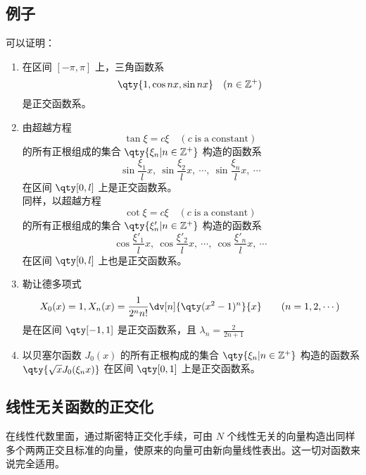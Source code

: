 \subsection{例子}
可以证明：
\begin{enumerate}
\item 在区间 $[-\pi,\pi]$ 上，三角函数系
\begin{equation}
\qty{1,\cos nx,\sin nx}\quad(n\in \mathbb{Z^{+}})~
\end{equation}
是正交函数系。
\item 由超越方程
\begin{equation}
\tan\xi=c\xi \quad(c\; \mathrm{is\; a\; constant})~
\end{equation}
 的所有正根组成的集合 $\qty{\xi_n\vert n\in\mathbb{Z}^+}$
 构造的函数系
 \begin{equation}
 \sin\frac{\xi_1}{l}x,\ \sin\frac{\xi_2}{l}x,\ \cdots,\ \sin\frac{\xi_n}{l}x,\ \cdots~
 \end{equation}
 在区间 $\qty[0,l]$ 上是正交函数系。\\
 
 同样，以超越方程
\begin{equation}
\cot\xi=c\xi \quad(c\; \mathrm{is\; a\; constant})~
\end{equation}
 的所有正根组成的集合 $\qty{\xi'_n\vert n\in\mathbb{Z}^+}$
 构造的函数系
 \begin{equation}
 \cos\frac{\xi'_1}{l}x,\ \cos\frac{\xi'_2}{l}x,\ \cdots,\ \cos\frac{\xi'_n}{l}x,\ \cdots~
 \end{equation}
 在区间 $\qty[0,l]$ 上也是正交函数系。
 \item 勒让德多项式
\begin{equation}
X_0(x)=1,X_n(x)=\frac{1}{2^nn!}\dv[n]{\qty(x^2-1)^n}{x}\qquad(n=1,2,\cdots)~
\end{equation}
是在区间 $\qty[-1,1]$ 是正交函数系，且 $\lambda_n=\frac{2}{2n+1}$
\item 以贝塞尔函数 $J_0(x)$ 的所有正根构成的集合 $\qty{\xi_n\vert n\in\mathbb{Z}^+}$
构造的函数系 $\qty{\sqrt{x}J_0(\xi_n x)} $ 在区间 $\qty[0,1]$ 上是正交函数系。
\end{enumerate}

\subsection{线性无关函数的正交化}
在线性代数里面，通过斯密特正交化手续，可由 $N$ 个线性无关的向量构造出同样多个两两正交且标准的向量，使原来的向量可由新向量线性表出。这一切对函数来说完全适用。

